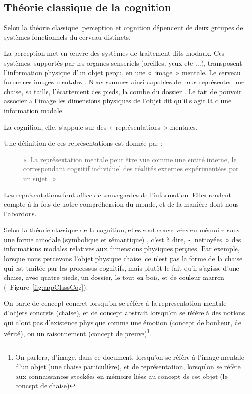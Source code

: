\subsection{Théorie classique de la cognition}
\label{sec:ch3_classicCognition}

Selon la théorie classique, perception et cognition dépendent de deux groupes de systèmes fonctionnels du cerveau distincts. 

La perception met en œuvre des systèmes de traitement dits modaux. Ces systèmes, supportés par les organes sensoriels (oreilles, yeux etc $\ldots$), transposent l'information physique d'un objet perçu, en une «~image~» mentale. Le cerveau forme ces images mentales \citep{barsalou2003situated,martin2001functional}. Nous sommes ainsi capables de nous représenter une chaise, sa taille, l'écartement des pieds, la courbe du dossier \etc. Le fait de pouvoir associer à l'image les dimensions physiques de l'objet dit qu'il s'agit là d'une information modale.

La cognition, elle, s'appuie sur des «~représentations~» mentales. 

Une définition de ces représentations est donnée par \citep{houde1998vocabulaire}:

\begin{quote}
«~La représentation mentale peut être vue comme une entité interne, le correspondant cognitif individuel des réalités externes expérimentées par un sujet.~»
\end{quote}

Les représentations font office de sauvegardes de l'information. Elles rendent compte à la fois de notre compréhension du monde, et de la manière dont nous l'abordons. 

Selon la théorie classique de la cognition, elles sont conservées en mémoire sous une forme amodale (symbolique et sémantique) \citep[p. 357]{mcadams1994penser}, c'est à dire, «~nettoyées~» des informations modales relatives aux dimensions physiques perçues. Par exemple, lorsque nous percevons l'objet physique chaise, ce n'est pas la forme de la chaise qui est traitée par les processus cognitifs, mais plutôt le fait qu'il s'agisse d'une chaise, avec quatre pieds, un dossier, le tout en bois, et de couleur marron (\cf~Figure~\ref{fig:appClassCog}).
 
On parle de concept concret lorsqu'on se réfère à la représentation mentale d'objets concrets (chaise), et de concept abstrait lorsqu'on se réfère à des notions qui n'ont pas d'existence physique comme une émotion (concept de bonheur, de vérité), ou un raisonnement (concept de preuve)\footnote{On parlera, d'image, dans ce document, lorsqu'on se réfère à l'image mentale d'un objet (une chaise particulière), et de représentation, lorsqu'on se réfère aux connaissances stockées en mémoire liées au concept de cet objet (le concept de chaise)}.
 

